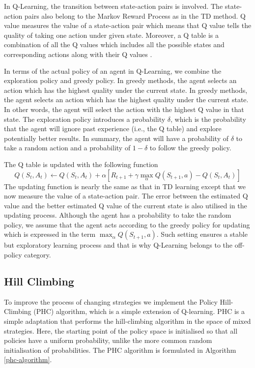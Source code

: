 In Q-Learning, the transition between state-action pairs is involved. The state-action pairs also belong to the Markov Reward Process as in the TD method. Q value measures the value of a state-action pair which means that Q value tells the quality of taking one action under given state. Moreover, a Q table is a combination of all the Q values which includes all the possible states and corresponding actions along with their Q values  \cite{alma991000179099701591}. 

In terms of the actual policy of an agent in Q-Learning, we combine the exploration policy and greedy policy. In greedy methods, the agent selects an action which has the highest quality under the current state. In greedy methods, the agent selects an action which has the highest quality under the current state. In other words, the agent will select the action with the highest Q value in that state. The exploration policy introduces a probability  $\delta$, which is the probability that the agent will ignore past experience (i.e., the Q table) and explore potentially better results. In summary, the agent will have a probability of $\delta$ to take a random action and a probability of $1-\delta$ to follow the greedy policy. 

The Q table is updated with the following function
\begin{equation}
    Q(S_t, A_t) \leftarrow Q(S_t, A_t)+\alpha\left[R_{t+1} + \gamma\max_{\alpha}Q(S_{t+1},a)-Q(S_t,A_t)\right]
\end{equation}
The updating function is nearly the same as that in TD learning except that we now measure the value of a state-action pair. The error between the estimated Q value and the better estimated Q value of the current state is also utilised in the updating process. Although the agent has a probability to take the random policy, we assume that the agent acts according to the greedy policy for updating which is expressed in the term $\max_{\alpha}Q(S_{t+1},a)$. Such setting ensures a stable but exploratory learning process and that is why Q-Learning belongs to the off-policy category.

\subsection{Hill Climbing}
To improve the process of changing strategies we implement the Policy Hill-Climbing (PHC) algorithm, which is a simple extension of Q-learning. PHC is a simple adaptation that performs the hill-climbing algorithm in the space of mixed strategies.  Here, the starting point of the policy space is initialised so that all policies have a uniform probability, unlike the more common random initialisation of probabilities. The PHC algorithm is formulated in Algorithm \ref{phc-algorithm}.


